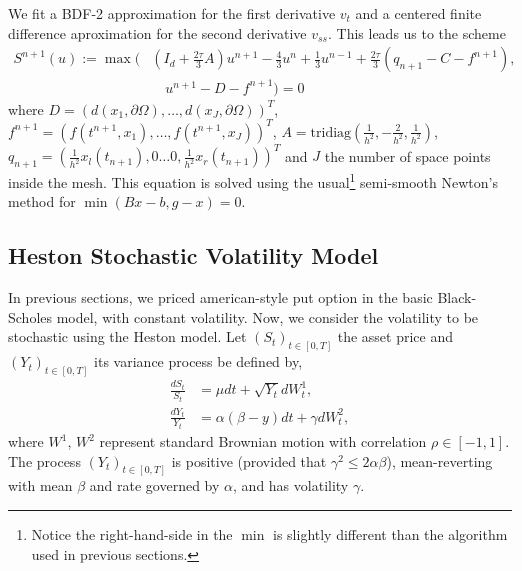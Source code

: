 \documentclass[12pt,a4paper]{article}
\begin{document}
We fit a BDF-2 approximation for the first derivative $v_t$ and a centered finite difference aproximation for the second derivative $v_{ss}$. This leads us to the scheme
\begin{align*}
	S^{n+1}(u) := \max \bigg( &(I_d +\frac{2\tau}{3} A) u^{n+1} - \frac{4}{3} u^n + \frac{1}{3} u^{n-1} + \frac{2\tau}{3} (q_{n+1} - C - f^{n+1}), \\
	& \quad u^{n+1} - D - f^{n+1} \bigg) = 0
\end{align*} 
where $D = (d(x_1, \partial \Omega), \dots, d(x_J, \partial \Omega))^T$, $f^{n+1} = (f(t^{n+1},x_1), \dots, f(t^{n+1},x_J))^T$, $A = \text{tridiag} \left( \frac{1}{h^2},-\frac{2}{h^2},\frac{1}{h^2} \right)$, $q_{n+1} = \left( \frac{1}{h^2} x_l(t_{n+1}), 0 \dots 0, \frac{1}{h^2} x_r(t_{n+1}) \right)^T$ and $J$ the number of space points inside the mesh. This equation is solved using the usual\footnote{Notice the right-hand-side in the $\min$ is slightly different than the algorithm used in previous sections.} semi-smooth Newton's method for $\min(Bx - b, g - x) = 0$.

		\subsection{Heston Stochastic Volatility Model}

	In previous sections, we priced american-style put option in the basic Black-Scholes model, with constant volatility. Now, we consider the volatility to be stochastic using the Heston model. Let $(S_t)_{t \in [0,T]}$ the asset price and $(Y_t)_{t \in [0,T]}$ its variance process be defined by,
\begin{align}
	\frac{dS_t}{S_t} &= \mu dt + \sqrt{Y_t} dW^1_t, \\
	\frac{dY_t}{Y_t} &= \alpha (\beta - y) dt + \gamma dW^2_t,
\end{align}
where $W^1$, $W^2$ represent standard Brownian motion with correlation $\rho \in [-1, 1]$. The process $(Y_t)_{t \in [0,T]}$ is positive (provided that $\gamma^2 \leq 2 \alpha \beta$), mean-reverting with mean $\beta$ and rate governed by $\alpha$, and has volatility $\gamma$. 
\end{document}
